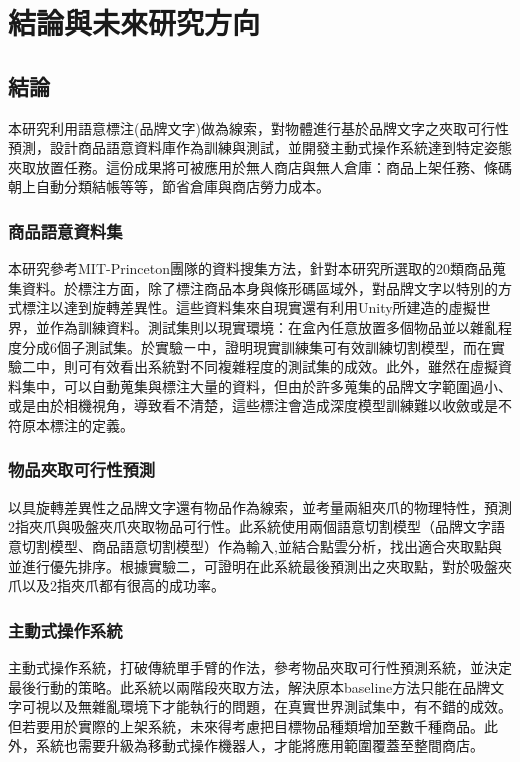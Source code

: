 \chapter{結論與未來研究方向}
\label{chapter:conclusions}

\section{結論}
本研究利用語意標注(品牌文字)做為線索，對物體進行基於品牌文字之夾取可行性預測，設計商品語意資料庫作為訓練與測試，並開發主動式操作系統達到特定姿態夾取放置任務。這份成果將可被應用於無人商店與無人倉庫：商品上架任務、條碼朝上自動分類結帳等等，節省倉庫與商店勞力成本。

\subsection{商品語意資料集}
本研究參考MIT-Princeton團隊的資料搜集方法，針對本研究所選取的20類商品蒐集資料。於標注方面，除了標注商品本身與條形碼區域外，對品牌文字以特別的方式標注以達到旋轉差異性。這些資料集來自現實還有利用Unity所建造的虛擬世界，並作為訓練資料。測試集則以現實環境：在盒內任意放置多個物品並以雜亂程度分成6個子測試集。於實驗ㄧ中，證明現實訓練集可有效訓練切割模型，而在實驗二中，則可有效看出系統對不同複雜程度的測試集的成效。此外，雖然在虛擬資料集中，可以自動蒐集與標注大量的資料，但由於許多蒐集的品牌文字範圍過小、或是由於相機視角，導致看不清楚，這些標注會造成深度模型訓練難以收斂或是不符原本標注的定義。

\subsection{物品夾取可行性預測}
以具旋轉差異性之品牌文字還有物品作為線索，並考量兩組夾爪的物理特性，預測2指夾爪與吸盤夾爪夾取物品可行性。此系統使用兩個語意切割模型（品牌文字語意切割模型、商品語意切割模型）作為輸入,並結合點雲分析，找出適合夾取點與並進行優先排序。根據實驗二，可證明在此系統最後預測出之夾取點，對於吸盤夾爪以及2指夾爪都有很高的成功率。

\subsection{主動式操作系統}
主動式操作系統，打破傳統單手臂的作法，參考物品夾取可行性預測系統，並決定最後行動的策略。此系統以兩階段夾取方法，解決原本baseline方法只能在品牌文字可視以及無雜亂環境下才能執行的問題，在真實世界測試集中，有不錯的成效。但若要用於實際的上架系統，未來得考慮把目標物品種類增加至數千種商品。此外，系統也需要升級為移動式操作機器人，才能將應用範圍覆蓋至整間商店。

